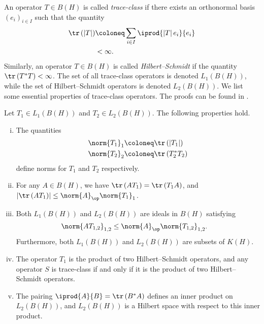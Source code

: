 \documentclass[10pt]{mypackage}
\begin{document}
An operator $T\in B(H)$ is called \textit{trace-class} if there exists an orthonormal basis $\left( e_i \right)_{i\in I}$ such that the quantity
\begin{align*}
  \tr\left( \left\vert T \right\vert \right) &\coloneq \sum_{i\in I} \iprod{\left\vert T \right\vert e_i}{e_i}\\
                                                           &< \infty.
\end{align*}
Similarly, an operator $T\in B(H)$ is called \textit{Hilbert--Schmidt} if the quantity $\tr\left( T^{\ast}T \right) < \infty$. The set of all trace-class operators is denoted $L_1\left( B(H) \right)$, while the set of Hilbert--Schmidt operators is denoted $L_2\left( B(H) \right)$. We list some essential properties of trace-class operators. The proofs can be found in \cite[Ch. 3, \S 18]{conway_operator_theory}.
\begin{proposition}
  Let $T_1\in L_1\left( B(H) \right)$ and $T_2\in L_2\left( B(H) \right)$. The following properties hold.
  \begin{enumerate}[(i)]
    \item The quantities 
      \begin{align*}
        \norm{T_1}_{1} &\coloneq \tr\left( \left\vert T_1 \right\vert \right)\\
        \norm{T_2}_{2} &\coloneq \tr\left( T_2^{\ast}T_2 \right)
      \end{align*}
      define norms for $T_1$ and $T_2$ respectively.
    \item For any $A\in B(H)$, we have $\tr\left( AT_1 \right) = \tr\left( T_1A \right)$, and $\left\vert \tr\left( AT_1 \right) \right\vert\leq \norm{A}_{\op}\norm{T_1}_{1}$.
    \item Both $L_1\left( B(H) \right)$ and $L_2\left( B(H) \right)$ are ideals in $B(H)$ satisfying
      \begin{align*}
        \norm{AT_{1,2}}_{1,2} &\leq \norm{A}_{\op}\norm{T_{1,2}}_{1,2}.
      \end{align*}
      Furthermore, both $L_1\left( B(H) \right)$ and $L_2\left( B(H) \right)$ are subsets of $K(H)$.
    \item The operator $T_1$ is the product of two Hilbert--Schmidt operators, and any operator $S$ is trace-class if and only if it is the product of two Hilbert--Schmidt operators.
    \item The pairing $ \iprod{A}{B} = \tr\left( B^{\ast}A \right) $ defines an inner product on $L_2\left( B(H) \right)$, and $L_2\left( B(H) \right)$ is a Hilbert space with respect to this inner product.
  \end{enumerate}
\end{proposition}
\end{document}
